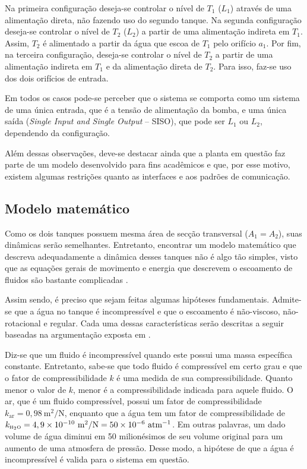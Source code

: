 Na primeira configuração deseja-se controlar o nível de $T_1$ ($L_1$) através de
uma alimentação direta, não fazendo uso do segundo tanque. Na segunda
configuração deseja-se controlar o nível de $T_2$ ($L_2$) a partir de uma
alimentação indireta em $T_1$. Assim, $T_2$ é alimentado a partir da água que
escoa de $T_1$ pelo orifício $a_1$. Por fim, na terceira configuração, deseja-se
controlar o nível de $T_2$ a partir de uma alimentação indireta em $T_1$ e da
alimentação direta de $T_2$. Para isso, faz-se uso dos dois orifícios de
entrada.


Em todos os casos pode-se perceber que o sistema se comporta como um sistema de
uma única entrada, que é a tensão de alimentação da bomba, e uma única saída
({\it Single Input and Single Output} -- SISO), que pode ser $L_1$ ou $L_2$,
dependendo da configuração.


Além dessas observações, deve-se destacar ainda que a planta em questão faz
parte de um modelo desenvolvido para fins acadêmicos e que, por esse motivo,
existem algumas restrições quanto as interfaces e aos padrões de comunicação.

\subsection{Modelo matemático}

Como os dois tanques possuem mesma área de secção transversal ($A_1 = A_2$),
suas dinâmicas serão semelhantes. Entretanto, encontrar um modelo matemático que
descreva adequadamente a dinâmica desses tanques não é algo tão simples, visto
que as equações gerais de movimento e energia que descrevem o escoamento de
fluidos são bastante complicadas \cite{dorf:2009}.

Assim sendo, é preciso que sejam feitas algumas hipóteses fundamentais.
Admite-se que a água no tanque é incompressível e que o escoamento é
não-viscoso, não-rotacional e regular. Cada uma dessas características serão
descritas a seguir baseadas na argumentação exposta em .

Diz-se que um fluido é incompressível quando este possui uma massa específica
constante. Entretanto, sabe-se que todo fluido é compressível em certo grau e
que o fator de compressibilidade $k$ é uma medida de sua compressibilidade.
Quanto menor o valor de $k$, menor é a compressibilidade indicada para aquele
fluido. O ar, que é um fluido compressível, possui um fator de compressibilidade
$k_{\text{ar}} = 0,98\ \text{m}^2/\text{N}$, enquanto que a água tem um fator de
compressibilidade de $k_{\tiny \text{\tiny H}_2\text{\tiny O}} = 4,9 \times
10^{-10}\ \text{m}^2/\text{N} = 50 \times 10^{-6}\ \text{atm}^{-1}$. Em outras
palavras, um dado volume de água diminui em 50 milionésimos de seu volume
original para um aumento de uma atmosfera de pressão. Desse modo, a hipótese de
que a água é incompressível é valida para o sistema em questão.

